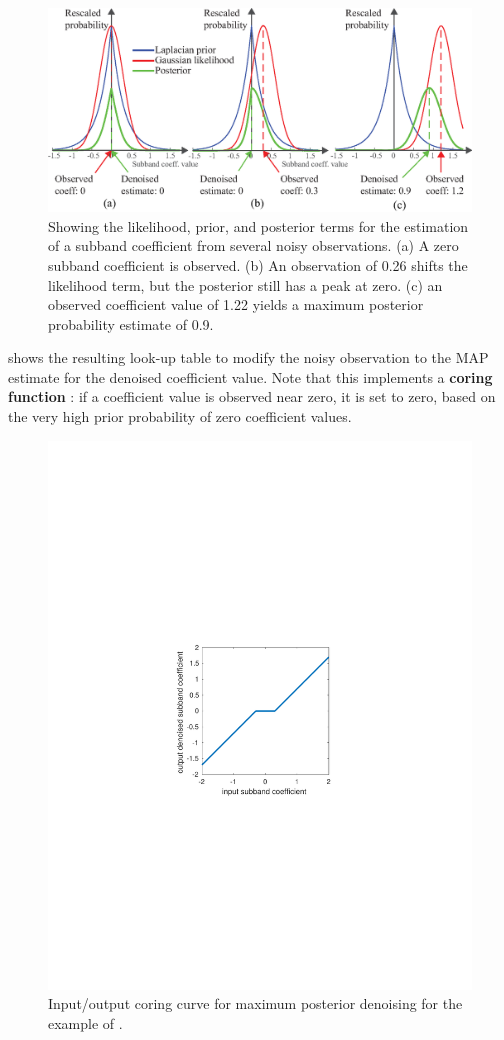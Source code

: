 \begin{figure}
\centerline{
\includegraphics[width=.9\linewidth]{figures/statistical_image_models/wavelet_denoising.eps}
}
\caption{Showing the likelihood, prior, and posterior terms for the estimation of a subband coefficient from several noisy observations.  (a)  A zero subband coefficient is observed. (b)  An observation of 0.26 shifts the likelihood term, but the posterior still has a peak at zero. (c) an observed coefficient value of 1.22 yields a maximum posterior probability estimate of 0.9.
}
\label{fig:waveletBayes}
\end{figure}


\Fig{\ref{fig:bayeslut}} shows the resulting look-up table to modify the noisy observation to the MAP estimate for the denoised coefficient value.  Note that this implements a {\bf coring function} \cite{Simoncelli96}:  if a coefficient value is observed near zero, it is set to zero, based on the very high prior probability of zero coefficient values. 


\begin{figure}
\centerline{
\includegraphics[width=0.4\linewidth]{figures/statistical_image_models/waveletlut.pdf}
}
\caption{Input/output coring curve for maximum posterior denoising for the example of \fig{\ref{fig:waveletBayes}}.
}
\label{fig:bayeslut}
\end{figure}

